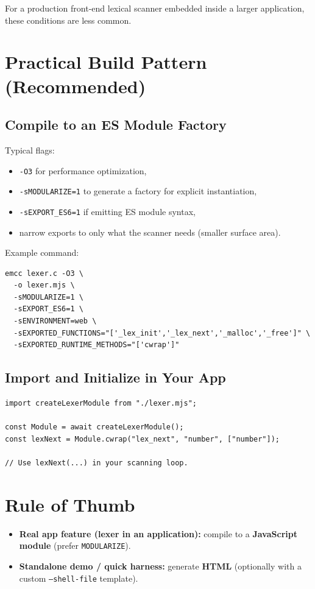 \documentclass[11pt]{article}
\begin{document}
For a production front-end lexical scanner embedded inside a larger application, these conditions are less common.

\section*{Practical Build Pattern (Recommended)}
\subsection*{Compile to an ES Module Factory}
Typical flags:
\begin{itemize}[leftmargin=*, itemsep=0.25em]
  \item \texttt{-O3} for performance optimization,
  \item \texttt{-sMODULARIZE=1} to generate a factory for explicit instantiation,
  \item \texttt{-sEXPORT\_ES6=1} if emitting ES module syntax,
  \item narrow exports to only what the scanner needs (smaller surface area).
\end{itemize}

\noindent Example command:
\begin{verbatim}
emcc lexer.c -O3 \
  -o lexer.mjs \
  -sMODULARIZE=1 \
  -sEXPORT_ES6=1 \
  -sENVIRONMENT=web \
  -sEXPORTED_FUNCTIONS="['_lex_init','_lex_next','_malloc','_free']" \
  -sEXPORTED_RUNTIME_METHODS="['cwrap']"
\end{verbatim}

\subsection*{Import and Initialize in Your App}
\begin{verbatim}
import createLexerModule from "./lexer.mjs";

const Module = await createLexerModule();
const lexNext = Module.cwrap("lex_next", "number", ["number"]);

// Use lexNext(...) in your scanning loop.
\end{verbatim}

\section*{Rule of Thumb}
\begin{itemize}[leftmargin=*, itemsep=0.35em]
  \item \textbf{Real app feature (lexer in an application):} compile to a \textbf{JavaScript module} (prefer \texttt{MODULARIZE}).
  \item \textbf{Standalone demo / quick harness:} generate \textbf{HTML} (optionally with a custom \texttt{--shell\allowbreak-file} template).
\end{itemize}
\end{document}
